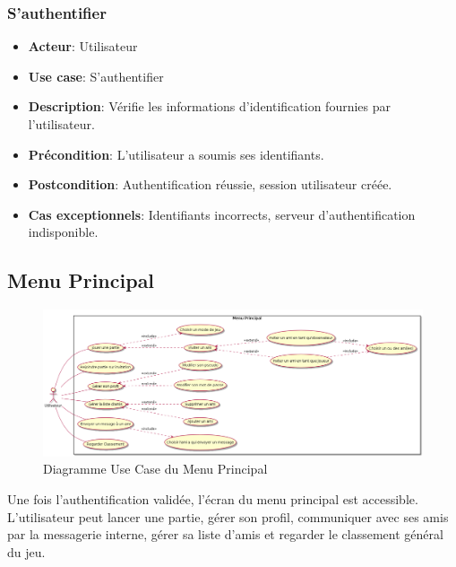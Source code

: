 \documentclass{article}
\begin{document}
\subsubsection*{S'authentifier}
\begin{itemize}
    \item \textbf{Acteur}: Utilisateur
    \item \textbf{Use case}: S'authentifier
    \item \textbf{Description}: Vérifie les informations d'identification fournies par l'utilisateur.
    \item \textbf{Précondition}: L'utilisateur a soumis ses identifiants.
    \item \textbf{Postcondition}: Authentification réussie, session utilisateur créée.
    \item \textbf{Cas exceptionnels}: Identifiants incorrects, serveur d’authentification indisponible.
\end{itemize}

\newpage

\subsection{Menu Principal}

\begin{figure}[!h]
    \centering
    \includegraphics[width=1\textwidth]{../res/uml/usecase/MenuPrincipalUseCase.png}
    \caption{Diagramme Use Case du Menu Principal}
    \label{fig:main-menu}
\end{figure}

Une fois l'authentification validée, l'écran du menu principal est accessible. L'utilisateur peut lancer une partie, gérer son profil, communiquer avec ses amis par la messagerie interne, gérer sa liste d'amis et regarder le classement général du jeu.
\end{document}
